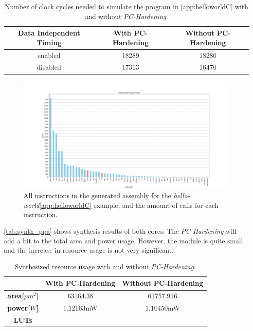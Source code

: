 \begin{table}[h]
\centering
\caption{Number of clock cycles needed to simulate the program in \autoref{app:helloworldC} with and without \textit{PC-Hardening}.}
\label{tab:simulation_cc}
\begin{tabular}{c|cc}
\toprule 
Data Independent Timing & With PC-Hardening & Without PC-Hardening \\
\midrule
\rowcolor{black!20} enabled & 18289 & 18280 \\
disabled & 17313 & 16470 \\
\bottomrule
\end{tabular}
\end{table}

\begin{figure}[h!]
    \centering
    \includegraphics[width=\textwidth]{docs/images/instruction_occurences.png}
    \caption{All instructions in the generated assembly for the \textit{hello-world}\autoref{app:helloworldC} example, and the amount of calls for each instruction.}
    \label{fig:instr_occ}
\end{figure}

\autoref{tab:synth_ppa} shows synthesis results of both cores. The \textit{PC-Hardening} will add a bit to the total area and power usage. However, the module is quite small and the increase in resource usage is not very significant. 

\begin{table}[h]
\centering
\caption{Synthesized resource usage with and without \textit{PC-Hardening}.}
\label{tab:synth_ppa}
\begin{tabular}{ccc}
\toprule 
& With PC-Hardening & Without PC-Hardening \\
\midrule
\rowcolor{black!20} \textbf{area[$pm^2$]} & 63164.38 & 61757.916 \\
\textbf{power[$W$]} & 1.12163mW & 1.10450mW \\
\rowcolor{black!20} \textbf{LUTs} & -- & -- \\
\bottomrule
\end{tabular}
\end{table}

